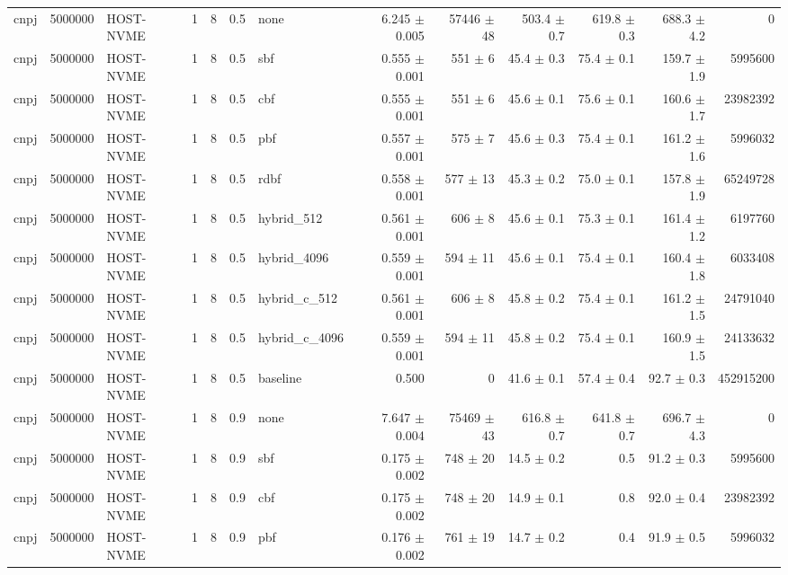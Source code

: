 \begin{tabular}{lllllllrrrrrr}
cnpj & 5000000 & HOST-NVME & 1 & 8 & 0.5 & none & 6.245 $\pm$ 0.005 & 57446 $\pm$ 48 & 503.4 $\pm$ 0.7 & 619.8 $\pm$ 0.3 & 688.3 $\pm$ 4.2 & 0 \\
cnpj & 5000000 & HOST-NVME & 1 & 8 & 0.5 & sbf & 0.555 $\pm$ 0.001 & 551 $\pm$ 6 & 45.4 $\pm$ 0.3 & 75.4 $\pm$ 0.1 & 159.7 $\pm$ 1.9 & 5995600 \\
cnpj & 5000000 & HOST-NVME & 1 & 8 & 0.5 & cbf & 0.555 $\pm$ 0.001 & 551 $\pm$ 6 & 45.6 $\pm$ 0.1 & 75.6 $\pm$ 0.1 & 160.6 $\pm$ 1.7 & 23982392 \\
cnpj & 5000000 & HOST-NVME & 1 & 8 & 0.5 & pbf & 0.557 $\pm$ 0.001 & 575 $\pm$ 7 & 45.6 $\pm$ 0.3 & 75.4 $\pm$ 0.1 & 161.2 $\pm$ 1.6 & 5996032 \\
cnpj & 5000000 & HOST-NVME & 1 & 8 & 0.5 & rdbf & 0.558 $\pm$ 0.001 & 577 $\pm$ 13 & 45.3 $\pm$ 0.2 & 75.0 $\pm$ 0.1 & 157.8 $\pm$ 1.9 & 65249728 \\
cnpj & 5000000 & HOST-NVME & 1 & 8 & 0.5 & hybrid\_512 & 0.561 $\pm$ 0.001 & 606 $\pm$ 8 & 45.6 $\pm$ 0.1 & 75.3 $\pm$ 0.1 & 161.4 $\pm$ 1.2 & 6197760 \\
cnpj & 5000000 & HOST-NVME & 1 & 8 & 0.5 & hybrid\_4096 & 0.559 $\pm$ 0.001 & 594 $\pm$ 11 & 45.6 $\pm$ 0.1 & 75.4 $\pm$ 0.1 & 160.4 $\pm$ 1.8 & 6033408 \\
cnpj & 5000000 & HOST-NVME & 1 & 8 & 0.5 & hybrid\_c\_512 & 0.561 $\pm$ 0.001 & 606 $\pm$ 8 & 45.8 $\pm$ 0.2 & 75.4 $\pm$ 0.1 & 161.2 $\pm$ 1.5 & 24791040 \\
cnpj & 5000000 & HOST-NVME & 1 & 8 & 0.5 & hybrid\_c\_4096 & 0.559 $\pm$ 0.001 & 594 $\pm$ 11 & 45.8 $\pm$ 0.2 & 75.4 $\pm$ 0.1 & 160.9 $\pm$ 1.5 & 24133632 \\
cnpj & 5000000 & HOST-NVME & 1 & 8 & 0.5 & baseline & 0.500 & 0 & 41.6 $\pm$ 0.1 & 57.4 $\pm$ 0.4 & 92.7 $\pm$ 0.3 & 452915200 \\
cnpj & 5000000 & HOST-NVME & 1 & 8 & 0.9 & none & 7.647 $\pm$ 0.004 & 75469 $\pm$ 43 & 616.8 $\pm$ 0.7 & 641.8 $\pm$ 0.7 & 696.7 $\pm$ 4.3 & 0 \\
cnpj & 5000000 & HOST-NVME & 1 & 8 & 0.9 & sbf & 0.175 $\pm$ 0.002 & 748 $\pm$ 20 & 14.5 $\pm$ 0.2 & 0.5 & 91.2 $\pm$ 0.3 & 5995600 \\
cnpj & 5000000 & HOST-NVME & 1 & 8 & 0.9 & cbf & 0.175 $\pm$ 0.002 & 748 $\pm$ 20 & 14.9 $\pm$ 0.1 & 0.8 & 92.0 $\pm$ 0.4 & 23982392 \\
cnpj & 5000000 & HOST-NVME & 1 & 8 & 0.9 & pbf & 0.176 $\pm$ 0.002 & 761 $\pm$ 19 & 14.7 $\pm$ 0.2 & 0.4 & 91.9 $\pm$ 0.5 & 5996032 \\

\end{tabular}
